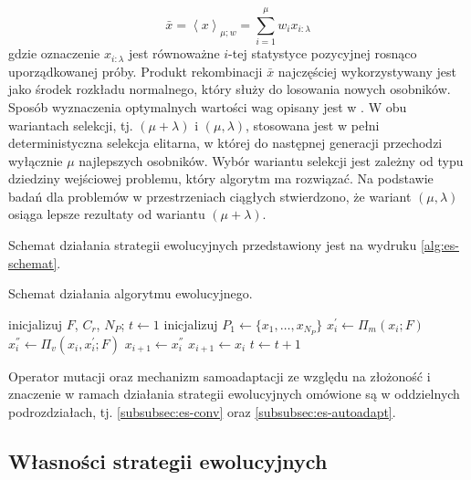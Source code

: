     \begin{equation}
        \bar{x} = \left<x\right>_{\mu; w} = \sum^{\mu}_{i = 1} w_{i}x_{i:\lambda}
    \end{equation}
    gdzie oznaczenie $x_{i:\lambda}$ jest równoważne $i$-tej statystyce pozycyjnej rosnąco uporządkowanej próby. Produkt rekombinacji $\bar{x}$ najczęściej wykorzystywany jest jako środek rozkładu normalnego, który służy do losowania nowych osobników. Sposób wyznaczenia optymalnych wartości wag opisany jest w \source.
    W obu wariantach selekcji, tj. $(\mu + \lambda)$ i $(\mu, \lambda)$, stosowana jest w pełni deterministyczna selekcja elitarna, w której do następnej generacji przechodzi wyłącznie $\mu$ najlepszych osobników.  Wybór wariantu selekcji jest zależny od typu dziedziny wejściowej problemu, który algorytm ma rozwiązać. Na podstawie badań dla problemów w przestrzeniach ciągłych stwierdzono, że wariant $(\mu, \lambda)$ osiąga lepsze rezultaty od wariantu  $(\mu + \lambda)$.
    
    Schemat działania strategii ewolucyjnych przedstawiony jest na wydruku \ref{alg:es-schemat}.

    \begin{algorithm}[h]
    \caption{Schemat działania algorytmu ewolucyjnego.}
    \label{alg:es-schemat}
    \begin{algorithmic}[1]
        \STATE inicjalizuj $F$, $C_r$, $N_{P}$;
        \STATE $t \gets 1$
        \STATE inicjalizuj $P_1 \gets \{x_{1}, \dots, x_{N_{P}}\}$
                \STATE $x^{'}_{i} \gets \Pi_{m}\left( x_{i}; F\right )$
                \STATE $x^{''}_{i} \gets \Pi_{v}\left( x_{i}, x^{'}_{i}; F\right )$
                    \STATE $x_{i+1} \gets x^{''}_{i} $
                \ELSE
                    \STATE $x_{i+1} \gets x_{i} $
                \ENDIF
            \ENDFOR
            $t \gets t + 1$
        \ENDWHILE
    \end{algorithmic}
    \end{algorithm}
    
    Operator mutacji oraz mechanizm samoadaptacji ze względu na złożoność i znaczenie w ramach działania strategii ewolucyjnych omówione są w oddzielnych podrozdziałach, tj. \ref{subsubsec:es-conv} oraz \ref{subsubsec:es-autoadapt}.
    
    \newpage

\subsection{Własności strategii ewolucyjnych}
\label{subsubsec:es-op-mut}

